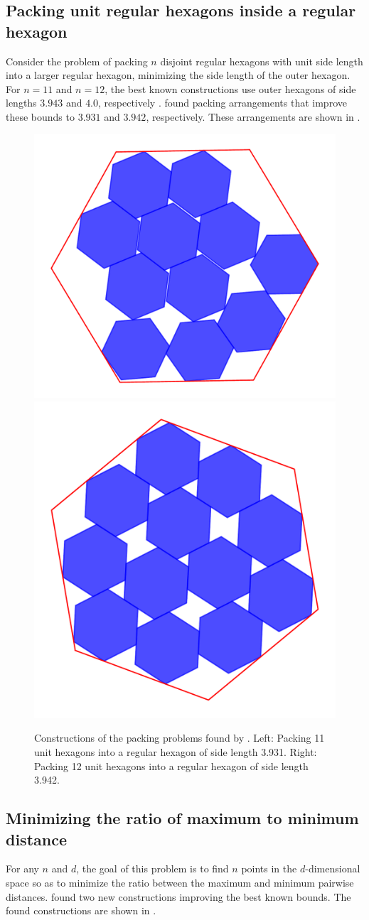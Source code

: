 \subsection{Packing unit regular hexagons inside a regular hexagon}
Consider the problem of packing $n$ disjoint regular hexagons with unit side length into a larger regular hexagon, minimizing the side length of the outer hexagon.
For $n=11$ and $n=12$, the best known constructions use outer hexagons of side lengths $3.943$ and $4.0$, respectively \cite{geometry_collection}.
\method found packing arrangements
that improve these bounds to $3.931$ and $3.942$, respectively.
These arrangements are shown in .

\begin{figure}
    \centering
    \includegraphics[width=0.4\linewidth]{figures/hexagon_11.pdf}
    \hfill
    \includegraphics[width=0.4\linewidth]{figures/hexagon_12.pdf}
    \caption{Constructions of the packing problems found by \method. Left: Packing 11 unit hexagons into a regular hexagon of side length 3.931. Right: Packing 12 unit hexagons into a regular hexagon of side length 3.942.
    \label{fig:hexagons}}
\end{figure}


\subsection{Minimizing the ratio of maximum to minimum distance}
For any $n$ and $d$, the goal of this problem is to find $n$ points in the $d$-dimensional space so as to minimize the ratio between the maximum and minimum pairwise distances. \method found two new constructions improving the best known bounds.
The found constructions are shown in .

